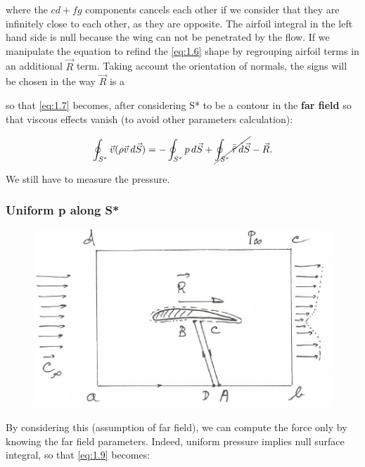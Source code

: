 		where the $cd + fg$ components cancels each other if we consider that they are infinitely close to each other, as they are opposite. The airfoil integral in the left hand side is null because the wing can not be penetrated by the flow. If we manipulate the equation to refind the \eqref{eq:1.6} shape by regrouping airfoil terms in an additional $\vec{R}$ term. Taking account the orientation of normals, the signs will be chosen in the way $\vec{R}$ is a
		
		\begin{center}
		\end{center}
		
		so that \eqref{eq:1.7} becomes, after considering S* to be a contour in the \textbf{far field} so that viscous effects vanish (to avoid other parameters calculation):
		
		\begin{equation}
		\oint _{S^*} \vec{v} (\rho \vec{v} \, d\vec{S}) = -\oint _{S^*} p \, d\vec{S} + \cancel{\oint _{S^*} \bar{\bar{\tau}} \, d\vec{S}} - \vec{R}.
		\label{eq:1.9}
		\end{equation}
		
		We still have to measure the pressure.
		
		\subsubsection{Uniform p along S*}
				\begin{figure}
				\vspace{-5mm}
				\includegraphics[scale=0.4]{ch1/2}
				\end{figure}
				By considering this (assumption of far field), we can compute the force only by knowing the far field parameters. Indeed, uniform pressure implies null surface integral, so that \eqref{eq:1.9} becomes:
				
